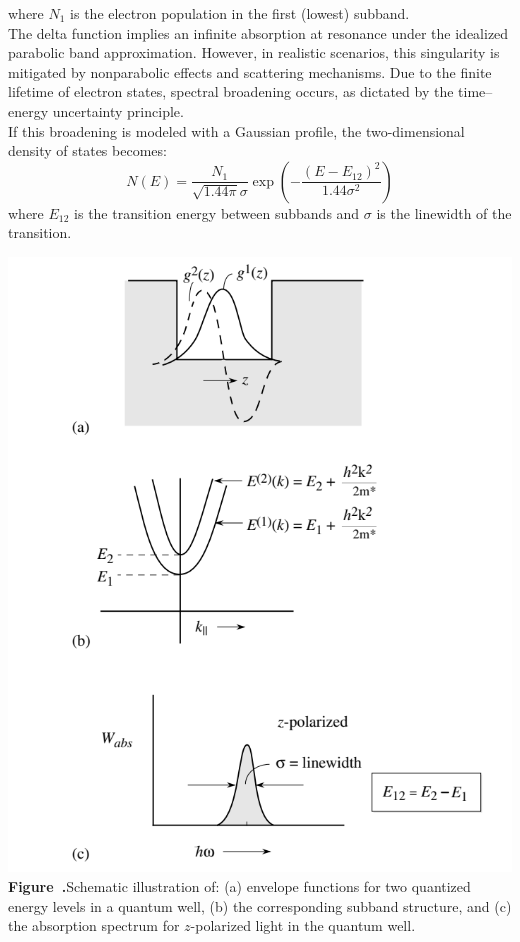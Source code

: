 where \( N_1 \) is the electron population in the first (lowest) subband.\\
The delta function implies an infinite absorption at resonance under the idealized parabolic band approximation. However, in realistic scenarios, this singularity is mitigated by nonparabolic effects and scattering mechanisms. Due to the finite lifetime of electron states, spectral broadening occurs, as dictated by the time–energy uncertainty principle.\\
If this broadening is modeled with a Gaussian profile, the two-dimensional density of states becomes:
\begin{equation}
	N(E) = \frac{N_1}{\sqrt{1.44 \pi} \sigma} \exp\left( -\frac{(E - E_{12})^2}{1.44 \sigma^2} \right)
\end{equation}
where \( E_{12} \) is the transition energy between subbands and \( \sigma \)  is the linewidth of the transition.
\begin{center}
	\begin{minipage}{0.65\textwidth}
		\centering
		\includegraphics[width=\textwidth]{img/IntrabandTransitions.png}
		\\[0.5em]
		\textbf{Figure~\thefigure.}Schematic illustration of:
		(a) envelope functions for two quantized energy levels in a quantum well,
		(b) the corresponding subband structure, and
		(c) the absorption spectrum for $z$-polarized light in the quantum well.
		\label{fig:IntrabandTransitions}
	\end{minipage}
\end{center}
